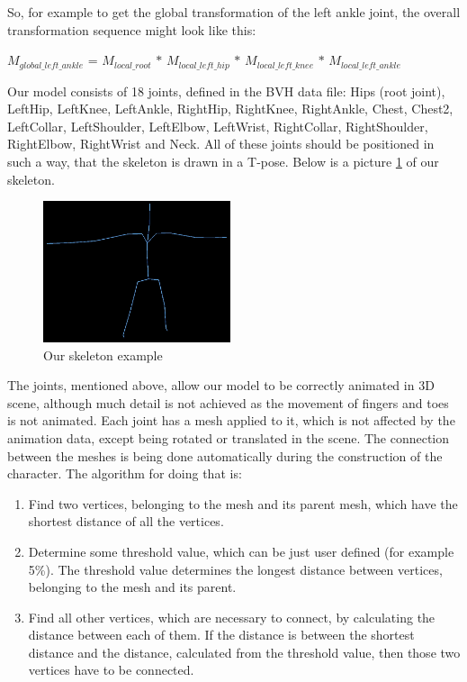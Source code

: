 \documentclass[times, 10pt,twocolumn]{article}
\begin{document}
So, for example to get the global transformation of the left ankle joint, the overall transformation sequence might look like this:

\begin{center}
$M_{global\_left\_ankle}$ = $M_{local\_root}$ $\ast$ $M_{local\_left\_hip}$ $\ast$ $M_{local\_left\_knee}$ $\ast$ $M_{local\_left\_ankle}$
\end{center}

\label{preparing_character}

Our model consists of 18 joints, defined in the BVH data file: Hips (root joint), LeftHip, LeftKnee, LeftAnkle, RightHip, RightKnee, RightAnkle, Chest, Chest2, LeftCollar, LeftShoulder, LeftElbow, LeftWrist, RightCollar, RightShoulder, RightElbow, RightWrist and Neck. All of these joints should be positioned in such a way, that the skeleton is drawn in a T-pose. Below is a picture \ref{our_skeleton} of our skeleton.

\begin{figure}[H]
  \caption{Our skeleton example}
  \label{our_skeleton}
  \centering
  \includegraphics[width=55mm]{images/our_skeleton.jpg}
\end{figure}

The joints, mentioned above, allow our model to be correctly animated in 3D scene, although much detail is not achieved as the movement of fingers and toes is not animated. Each joint has a mesh applied to it, which is not affected by the animation data, except being rotated or translated in the scene. The connection between the meshes is being done automatically during the construction of the character. The algorithm for doing that is:

\begin{enumerate}
\item Find two vertices, belonging to the mesh and its parent mesh, which have the shortest distance of all the vertices.
\item Determine some threshold value, which can be just user defined (for example 5\%). The threshold value determines the longest distance between vertices, belonging to the mesh and its parent.
\item Find all other vertices, which are necessary to connect, by calculating the distance between each of them. If the distance is between the shortest distance and the distance, calculated from the threshold value, then those two vertices have to be connected.
\end{enumerate}
\end{document}
